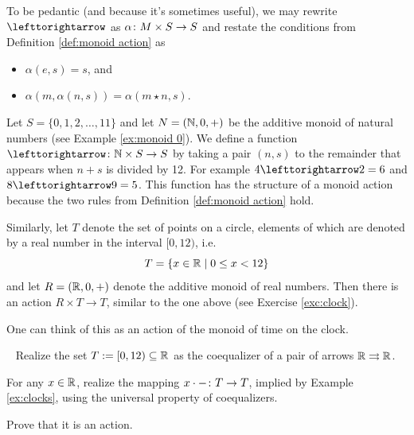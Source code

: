 \begin{definitionRUS}\label{def:monoid action}
\end{definitionRUS}

\begin{remarkENG}\label{rmk:monoid action}
To be pedantic (and because it's sometimes useful), we may rewrite $\acts$ as $\alpha\colon M\times S\rightarrow S$ and restate the conditions from Definition \ref{def:monoid action} as
\begin{itemize}
\item $\alpha(e,s)=s$, and
\item $\alpha(m,\alpha(n,s))=\alpha(m\star n,s)$.
\end{itemize}
\end{remarkENG}

\begin{remarkRUS}\label{rmk:monoid action}
\end{remarkRUS}

\begin{exampleENG}\label{ex:clocks}
Let $S=\{0,1,2,\ldots,11\}$ and let $N=({\mathbb N},0,+)$ be the additive monoid of natural numbers (see Example \ref{ex:monoid 0}).  We define a function $\acts\taking\NN\times S\to S$ by taking a pair $(n,s)$ to the remainder that appears when $n+s$ is divided by 12. For example $4\acts 2=6$ and $8\acts 9 = 5$. This function has the structure of a monoid action because the two rules from Definition \ref{def:monoid action} hold.

Similarly, let $T$ denote the set of points on a circle, elements of which are denoted by a real number in the interval $[0,12)$, i.e. $$T=\{x\in{\mathbb R}{\;|\;}0\leq x< 12\}$$ and let $R=({\mathbb R},0,+)$ denote the additive monoid of real numbers. Then there is an action $R\times T\to T$, similar to the one above (see Exercise \ref{exc:clock}).

One can think of this as an action of the monoid of time on the clock.
\end{exampleENG}

\begin{exampleRUS}\label{ex:clocks}
\end{exampleRUS}

\begin{exerciseENG}\label{exc:clock}~
\sexc Realize the set $T:=[0,12)\subseteq{\mathbb R}$ as the coequalizer of a pair of arrows ${\mathbb R}\rightrightarrows{\mathbb R}$. 
\item For any $x\in{\mathbb R}$, realize the mapping $x\cdot-\colon T\rightarrow T$, implied by Example \ref{ex:clocks}, using the universal property of coequalizers. 
\item Prove that it is an action.
\endsexc
\end{exerciseENG}

